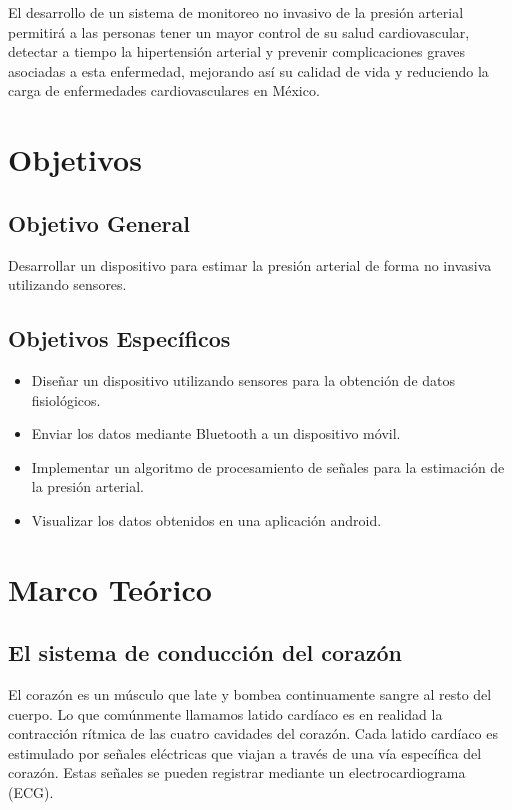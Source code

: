 El desarrollo de un sistema de monitoreo no invasivo de la presión arterial permitirá a las personas tener un mayor control de su salud cardiovascular, detectar a tiempo la hipertensión arterial y prevenir complicaciones graves asociadas a esta enfermedad, mejorando así su calidad de vida y reduciendo la carga de enfermedades cardiovasculares en México.


\newpage
\section{Objetivos}
    \subsection{Objetivo General}
    Desarrollar un dispositivo para estimar la presión arterial de forma no invasiva utilizando sensores.
    \subsection{Objetivos Específicos}
    \begin{itemize}
        \item Diseñar un dispositivo utilizando sensores para la obtención de datos fisiológicos.
        \item Enviar los datos mediante Bluetooth a un dispositivo móvil.
        \item Implementar un algoritmo de procesamiento de señales para la estimación de la presión arterial.
        \item Visualizar los datos obtenidos en una aplicación android.
    \end{itemize}

\newpage
\section{Marco Teórico}

    \subsection{El sistema de conducción del corazón}

    El corazón es un músculo que late y bombea continuamente sangre al resto del cuerpo. Lo que comúnmente llamamos latido cardíaco es en realidad la contracción rítmica de las cuatro cavidades del corazón. Cada latido cardíaco es estimulado por señales eléctricas que viajan a través de una vía específica del corazón. Estas señales se pueden registrar mediante un electrocardiograma (ECG).

